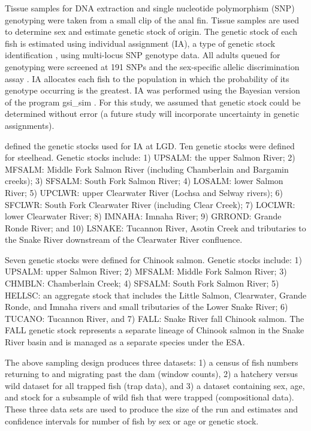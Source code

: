 \documentclass[12pt]{article}
\begin{document}
Tissue samples for DNA extraction and single nucleotide polymorphism (SNP) genotyping were taken from a small clip of the anal fin.  Tissue samples are used to determine sex and estimate genetic stock of origin. The genetic stock of each fish is estimated using individual assignment (IA), a type of genetic stock identification  \cite{Pella1987,Shaklee1999}, using multi-locus SNP genotype data.  All adults queued for genotyping were screened at 191 SNPs and the sex-specific allelic discrimination assay \cite{Campbell2012}. IA allocates each fish to the population in which the probability of its genotype occurring is the greatest. IA was performed using the Bayesian version of the program gsi\_sim \cite{Anderson2008,Anderson2010}. For this study, we assumed that genetic stock could be determined without error (a future study will incorporate uncertainty in genetic assignments). 

 defined the genetic stocks used for IA at LGD. Ten genetic stocks were defined for steelhead. Genetic stocks include: 1) UPSALM: the upper Salmon River; 2) MFSALM: Middle Fork Salmon River (including Chamberlain and Bargamin creeks); 3) SFSALM: South Fork Salmon River; 4) LOSALM: lower Salmon River; 5) UPCLWR: upper Clearwater River (Lochsa and Selway rivers); 6) SFCLWR: South Fork Clearwater River (including Clear Creek); 7) LOCLWR: lower Clearwater River; 8) IMNAHA: Imnaha River; 9) GRROND: Grande Ronde River; and 10) LSNAKE: Tucannon River, Asotin Creek and tributaries to the Snake River downstream of the Clearwater River confluence.

Seven genetic stocks were defined for Chinook salmon. Genetic stocks include: 1) UPSALM: upper Salmon River; 2) MFSALM: Middle Fork Salmon River; 3) CHMBLN: Chamberlain Creek; 4) SFSALM: South Fork Salmon River; 5) HELLSC: an aggregate stock that includes the Little Salmon, Clearwater, Grande Ronde, and Imnaha rivers and small tributaries of the Lower Snake River; 6) TUCANO: Tucannon River, and 7) FALL: Snake River fall Chinook salmon. The FALL genetic stock represents a separate lineage of Chinook salmon in the Snake River basin and is managed as a separate species under the ESA.

The above sampling design produces three datasets: 1) a census of fish numbers returning to and migrating past the dam (window counts), 2) a hatchery versus wild dataset for all trapped fish (trap data), and 3) a dataset containing sex, age, and stock for a subsample of wild fish that were trapped (compositional data). These three data sets are used to produce the size of the run and estimates and confidence intervals for number of fish by sex or age or genetic stock.
\end{document}
